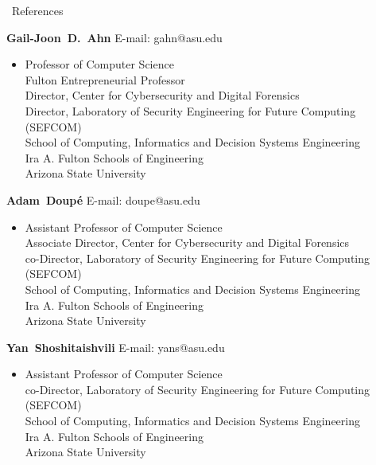 \documentclass{resume} %
\newenvironment{innerlist}[1][\enskip\textbullet]%
{\begin{itemize}[#1,leftmargin=*,parsep=0pt,itemsep=0pt,topsep=0pt,partopsep=0pt]}
	{\end{itemize}}
\newcommand{\halfblankline}{\quad\vspace{-0.5\baselineskip}\pagebreak[3]}
\begin{document}
\newpage
\begin{rSection}{\faGenderless~References}
	
	\textbf{Gail-Joon~D.~Ahn} \hfill{E-mail: gahn@asu.edu}
	\begin{innerlist}
		\item[] 
		Professor of Computer Science \\
		Fulton Entrepreneurial Professor \\
		Director, Center for Cybersecurity and Digital Forensics \\
		Director, Laboratory of Security Engineering for Future Computing (SEFCOM) \\
		School of Computing, Informatics and Decision Systems Engineering \\
		Ira A. Fulton Schools of Engineering \\
		Arizona State University
	\end{innerlist}
	
	\halfblankline
	
	\textbf{Adam~Doup\'e} \hfill{E-mail: doupe@asu.edu}
	\begin{innerlist}
		\item[] 
		Assistant Professor of Computer Science \\
		Associate Director, Center for Cybersecurity and Digital Forensics \\
		co-Director, Laboratory of Security Engineering for Future Computing (SEFCOM) \\
		School of Computing, Informatics and Decision Systems Engineering \\
		Ira A. Fulton Schools of Engineering \\
		Arizona State University
	\end{innerlist}

	\halfblankline
	
	\textbf{Yan~Shoshitaishvili} \hfill{E-mail: yans@asu.edu}
	\begin{innerlist}
		\item[] 
		Assistant Professor of Computer Science \\
		co-Director, Laboratory of Security Engineering for Future Computing (SEFCOM) \\
		School of Computing, Informatics and Decision Systems Engineering \\
		Ira A. Fulton Schools of Engineering \\
		Arizona State University
	\end{innerlist}


\end{rSection}
\end{document}
